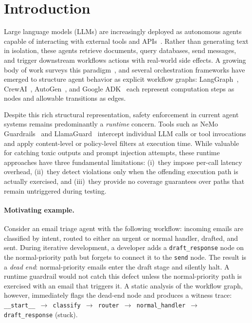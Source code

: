 \section{Introduction}
\label{sec:introduction}

Large language models (LLMs) are increasingly deployed as autonomous
agents capable of interacting with external tools and
APIs~\citep{schick2024toolformer, yao2023react}. Rather than generating
text in isolation, these agents retrieve documents, query databases,
send messages, and trigger downstream workflows actions with
real-world side effects. A growing body of work surveys this
paradigm~\citep{wang2024agent_survey}, and several orchestration
frameworks have emerged to structure agent behavior as explicit workflow
graphs: LangGraph~\citep{langgraph_docs},
CrewAI~\citep{crewai_docs}, AutoGen~\citep{wu2023autogen}, and Google
ADK~\citep{google_adk_docs} each represent computation steps as nodes
and allowable transitions as edges.

Despite this rich structural representation, safety enforcement in
current agent systems remains predominantly a \emph{runtime} concern.
Tools such as NeMo Guardrails~\citep{nemo_guardrails} and
LlamaGuard~\citep{llamaguard} intercept individual LLM calls or tool
invocations and apply content-level or policy-level filters at execution
time. While valuable for catching toxic outputs and prompt injection
attempts, these runtime approaches have three fundamental limitations:
(i)~they impose per-call latency overhead, (ii)~they detect violations
only when the offending execution path is actually exercised, and
(iii)~they provide no coverage guarantees over paths that remain
untriggered during testing.

\paragraph{Motivating example.}
Consider an email triage agent with the following workflow: incoming
emails are classified by intent, routed to either an urgent or normal
handler, drafted, and sent. During iterative development, a developer
adds a \texttt{draft\_response} node on the normal-priority path but
forgets to connect it to the \texttt{send} node. The result is a
\emph{dead end}: normal-priority emails enter the draft stage and
silently halt. A runtime guardrail would not catch this defect unless
the normal-priority path is exercised with an email that triggers it.
A static analysis of the workflow graph, however, immediately flags the
dead-end node and produces a witness trace:
\texttt{\_\_start\_\_ $\to$ classify $\to$ router $\to$
normal\_handler $\to$ draft\_response} (stuck).

